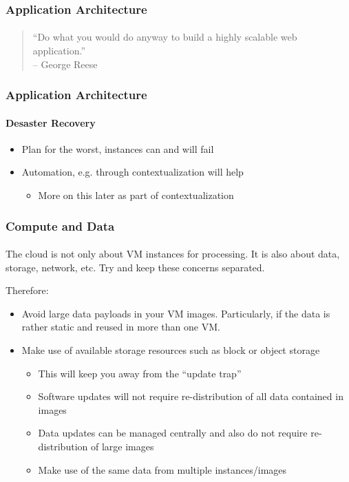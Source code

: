 
\begin{frame}
\frametitle{Application Architecture}
\framesubtitle{}
\begin{quote}
  ``Do what you would do anyway to build a highly scalable web application.''\\
  \hfill{}-- George Reese
\end{quote}
\end{frame}

\begin{frame}
\frametitle{Application Architecture}
\framesubtitle{Desaster Recovery}
\begin{itemize}
\item Plan for the worst, instances can and will fail
\item Automation, e.g. through contextualization will help
  \begin{itemize}
  \item More on this later as part of contextualization
  \end{itemize}
\end{itemize}
\end{frame}



\begin{frame}
\frametitle{Compute and Data}
\framesubtitle{}
The cloud is not only about VM instances for processing. It is
also about data, storage, network, etc. Try and keep these concerns
separated.

Therefore:
\begin{itemize}
\item Avoid large data payloads in your VM images. Particularly, if
  the data is rather static and reused in more than one VM.
\item Make use of available storage resources such as block or object
  storage
  \begin{itemize}
  \item This will keep you away from the ``update trap''
  \item Software updates will not require re-distribution of all data
    contained in images
  \item Data updates can be managed centrally and also do not require
    re-distribution of large images
  \item Make use of the same data from multiple instances/images
  \end{itemize}
\end{itemize}
\end{frame}

